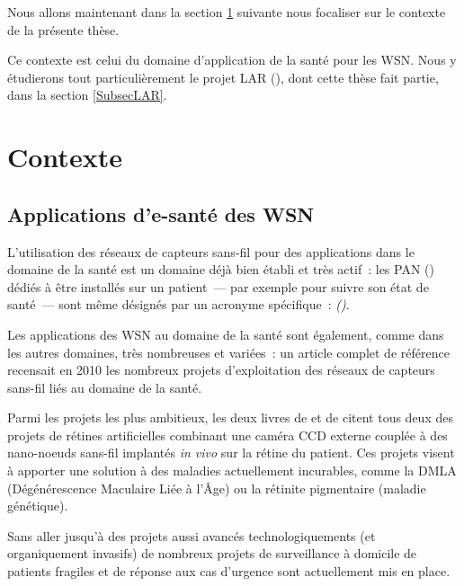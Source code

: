 \newpage

Nous allons maintenant dans la section \ref{SecContexte} suivante
nous focaliser sur le contexte de la présente thèse.

Ce contexte est celui du domaine d'application de la santé pour les WSN.
Nous y étudierons tout particulièrement le projet LAR (), dont cette thèse fait partie, dans la section
\vref{SubsecLAR}.


\section{Contexte}
\label{SecContexte}


\subsection{Applications d'e-santé des WSN}
\label{SubsecSanteWSN}

L'utilisation des réseaux de capteurs sans-fil pour des applications
dans le domaine de la santé est un domaine déjà bien établi et très
actif~: les PAN () dédiés à être installés
sur un patient~--- par exemple pour suivre son état de santé~--- sont
même désignés par un acronyme spécifique~:  \emph{()}.

Les applications des WSN au domaine de la santé sont également, comme dans
les autres domaines, très nombreuses et variées~: un article complet
de référence \cite{WSN-HealthCare-Survey-2010} recensait en 2010 les
nombreux projets d'exploitation des réseaux de capteurs sans-fil liés
au domaine de la santé.

Parmi les projets les plus ambitieux, les deux livres de
\cite{LivreDargie2010} et de \cite{LivreAkyildiz2010} citent tous deux des
projets de rétines artificielles \cite{RetineArtificielle}
\cite{RetineArtificielle2} combinant une caméra CCD externe couplée à des
nano-noeuds sans-fil implantés \emph{in vivo} sur la rétine du patient.
Ces projets visent à apporter une solution à des maladies actuellement
incurables, comme la DMLA (Dégénérescence Maculaire Liée à l'Âge) ou
la rétinite pigmentaire (maladie génétique).

Sans aller jusqu'à des projets aussi avancés technologiquements (et
organiquement invasifs) de nombreux projets de surveillance à domicile
de patients fragiles et de réponse aux cas d'urgence sont actuellement
mis en place.

